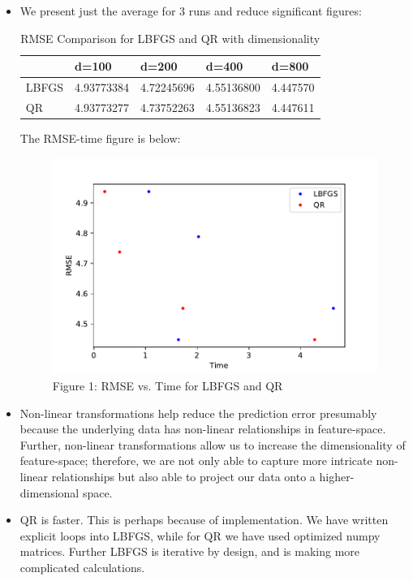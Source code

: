 \documentclass[submit]{harvardml}
\begin{document}
\begin{itemize}
	\item We present just the average for 3 runs and reduce significant figures:

\begin{table}[tbh]
\centering
\caption{RMSE Comparison for LBFGS and QR with dimensionality}
\label{my-label}
\begin{tabular}{@{}lllll@{}}
\toprule
      & d=100        & d=200        & d=400        & d=800      \\ \midrule
LBFGS & 4.93773384 & 4.72245696 & 4.55136800 & 4.447570 \\
QR    & 4.93773277 & 4.73752263 & 4.55136823 & 4.447611 \\ \bottomrule
\end{tabular}
\end{table}

The RMSE-time figure is below:
\begin{figure}[tbh!]
	\centering
	\includegraphics[scale=0.7]{rmse-time.pdf}
	\caption{Figure 1: RMSE vs. Time for LBFGS and QR}
\end{figure}
	\item Non-linear transformations help reduce the prediction error presumably because the underlying data has non-linear relationships in feature-space. Further, non-linear transformations allow us to increase the dimensionality of feature-space; therefore, we are not only able to capture more intricate non-linear relationships but also able to project our data onto a higher-dimensional space.
	\item QR is faster. This is perhaps because of implementation. We have written explicit loops into LBFGS, while for QR we have used optimized numpy matrices. Further LBFGS is iterative by design, and is making more complicated calculations.
\end{itemize}
\end{document}
